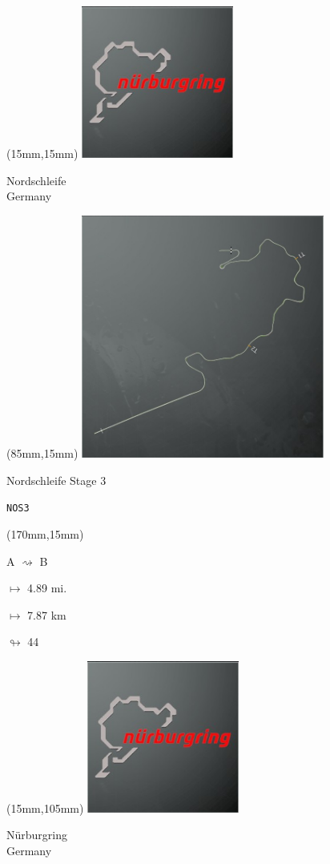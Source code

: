 \begin{textblock*}{60mm}(15mm,15mm)%
\includegraphics[width=50mm]{LG/2015-05-20_00088.png}
\par Nordschleife\\ Germany
\end{textblock*}
\begin{textblock*}{80mm}(85mm,15mm)%
\includegraphics[width=80mm]{TR/2015-05-20_00040.png}
\centerline{Nordschleife Stage 3}
\par\hfill\tiny\tt NOS3\\
\end{textblock*}
\begin{textblock*}{30mm}(170mm,15mm)%
\par A $\rightsquigarrow$ B
\Large
\par$\mapsto$ 4.89 mi.
\par$\mapsto$ 7.87 km
\par$\looparrowright$ 44
\end{textblock*}
\begin{textblock*}{60mm}(15mm,105mm)%
\includegraphics[width=50mm]{LG/2015-05-20_00089.png}
\par Nürburgring\\ Germany
\end{textblock*}

